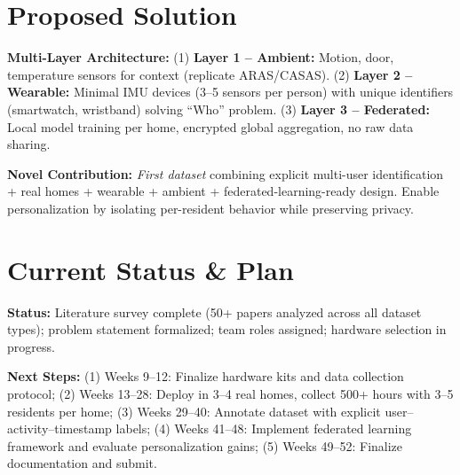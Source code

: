 \documentclass[11pt, a4paper]{article}
\begin{document}
\section{Proposed Solution}

\textbf{Multi-Layer Architecture:} (1) \textbf{Layer 1 -- Ambient:} Motion, door, temperature sensors for context (replicate ARAS/CASAS). (2) \textbf{Layer 2 -- Wearable:} Minimal IMU devices (3--5 sensors per person) with unique identifiers (smartwatch, wristband) solving ``Who'' problem. (3) \textbf{Layer 3 -- Federated:} Local model training per home, encrypted global aggregation, no raw data sharing. 

\textbf{Novel Contribution:} \textit{First dataset} combining explicit multi-user identification + real homes + wearable + ambient + federated-learning-ready design. Enable personalization by isolating per-resident behavior while preserving privacy.

\section{Current Status \& Plan}

\textbf{Status:} Literature survey complete (50+ papers analyzed across all dataset types); problem statement formalized; team roles assigned; hardware selection in progress.

\textbf{Next Steps:} (1) Weeks 9--12: Finalize hardware kits and data collection protocol; (2) Weeks 13--28: Deploy in 3--4 real homes, collect 500+ hours with 3--5 residents per home; (3) Weeks 29--40: Annotate dataset with explicit user--activity--timestamp labels; (4) Weeks 41--48: Implement federated learning framework and evaluate personalization gains; (5) Weeks 49--52: Finalize documentation and submit.

\vspace{0.15cm}
\renewcommand{\refname}{\normalsize References}


\end{document}
